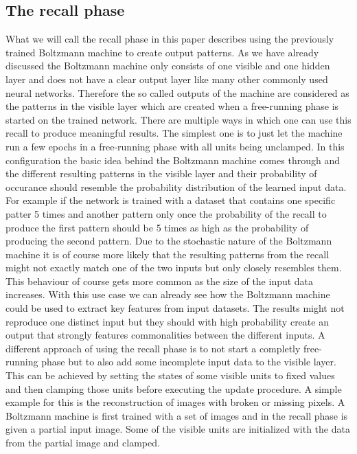 \documentclass[12pt,twoside]{article}
\theoremstyle{plain}
\theoremstyle{definition}
\theoremstyle{remark}
\begin{document}
\subsection{The recall phase}
What we will call the recall phase in this paper describes using the previously trained Boltzmann machine to create output patterns.
As we have already discussed the Boltzmann machine only consists of one visible and one hidden layer and does not have a clear output
layer like many other commonly used neural networks. Therefore the so called outputs of the machine are considered as the patterns
in the visible layer which are created when a free-running phase is started on the trained network.
There are multiple ways in which one can use this recall to produce meaningful results. The simplest one is to just let the
machine run a few epochs in a free-running phase with all units being unclamped. In this configuration the basic idea behind the
Boltzmann machine comes through and the different resulting patterns in the visible layer and their probability of occurance should
resemble the probability distribution of the learned input data. For example if the network is trained with a dataset
that contains one specific patter 5 times and another pattern only once the probability of the recall to produce the first
pattern should be 5 times as high as the probability of producing the second pattern. Due to the stochastic nature of the Boltzmann
machine it is of course more likely that the resulting patterns from the recall might not exactly match one of the two inputs
but only closely resembles them. This behaviour of course gets more common as the size of the input data increases.
With this use case we can already see how the Boltzmann machine could be used to extract key features from input datasets.
The results might not reproduce one distinct input but they should with high probability create an output that strongly
features commonalities between the different inputs.\newline
A different approach of using the recall phase is to not start a completly free-running phase but to also add some incomplete
input data to the visible layer. This can be achieved by setting the states of some visible units to fixed values and then 
clamping those units before executing the update procedure. A simple example for this is the reconstruction of images
with broken or missing pixels. A Boltzmann machine is first trained with a set of images and in the recall phase
is given a partial input image. Some of the visible units are initialized with the data from the partial image and clamped.
\end{document}
